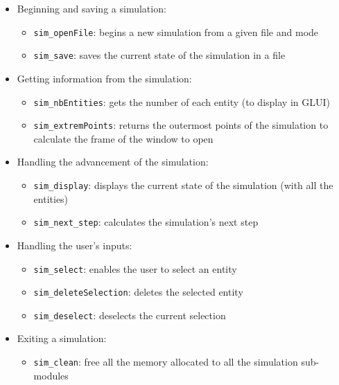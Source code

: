 \documentclass[a4paper]{article} %
\begin{document}
\begin{multicols*}{2}
\begin{itemize}
\item Beginning and saving a simulation:
    \begin{itemize}
    \item \texttt{sim\_openFile}: begins a new simulation from a given file and mode
    \item \texttt{sim\_save}: saves the current state of the simulation in a file
    \end{itemize}
\item Getting information from the simulation:
    \begin{itemize}
    \item \texttt{sim\_nbEntities}: gets the number of each entity (to display in GLUI)
    \item \texttt{sim\_extremPoints}: returns the outermost points of the simulation to calculate the frame of the window to open
    \end{itemize}
\item Handling the advancement of the simulation:
    \begin{itemize}
    \item \texttt{sim\_display}: displays the current state of the simulation (with all the entities) 
    \item \texttt{sim\_next\_step}: calculates the simulation's next step
    \end{itemize}
\item Handling the user's inputs:
    \begin{itemize}
    \item \texttt{sim\_select}: enables the user to select an entity
    \item \texttt{sim\_deleteSelection}: deletes the selected entity
    \item \texttt{sim\_deselect}: deselects the current selection
    \end{itemize}
\item Exiting a simulation:
    \begin{itemize}
    \item \texttt{sim\_clean}: free all the memory allocated to all the simulation sub-modules
    \end{itemize}
\end{itemize}



\label{lastpage}
\end{multicols*}
\end{document}
